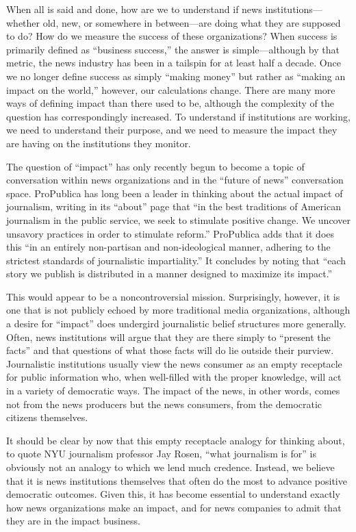 When all is said and done, how are we to understand if news institutions—
whether old, new, or somewhere in between—are doing what they are supposed
to do? How do we measure the success of these organizations? When success is
primarily defined as ``business success,'' the answer is simple—although by that
metric, the news industry has been in a tailspin for at least half a decade. Once
we no longer define success as simply ``making money'' but rather as ``making an
impact on the world,'' however, our calculations change. There are many more
ways of defining impact than there used to be, although the complexity of the question has correspondingly increased. To understand if institutions are working,
we need to understand their purpose, and we need to measure the impact they
are having on the institutions they monitor.

The question of ``impact'' has only recently begun to become a topic of conversation
within news organizations and in the ``future of news'' conversation space.
ProPublica has long been a leader in thinking about the actual impact of journalism,
writing in its ``about'' page that ``in the best traditions of American journalism
in the public service, we seek to stimulate positive change. We uncover
unsavory practices in order to stimulate reform.'' ProPublica adds that it does this
``in an entirely non-partisan and non-ideological manner, adhering to the strictest
standards of journalistic impartiality.'' It concludes by noting that ``each story
we publish is distributed in a manner designed to maximize its impact.''

This would appear to be a noncontroversial mission. Surprisingly, however, it is
one that is not publicly echoed by more traditional media organizations, although
a desire for ``impact'' does undergird journalistic belief structures more generally.
Often, news institutions will argue that they are there simply to ``present the
facts'' and that questions of what those facts will do lie outside their purview.
Journalistic institutions usually view the news consumer as an empty receptacle
for public information who, when well-filled with the proper knowledge, will
act in a variety of democratic ways. The impact of the news, in other words,
comes not from the news producers but the news consumers, from the democratic
citizens themselves.

It should be clear by now that this empty receptacle analogy for thinking about,
to quote NYU journalism professor Jay Rosen, ``what journalism is for'' is obviously
not an analogy to which we lend much credence. Instead, we believe that
it is news institutions themselves that often do the most to advance positive
democratic outcomes. Given this, it has become essential to understand exactly
how news organizations make an impact, and for news companies to admit that
they are in the impact business.

